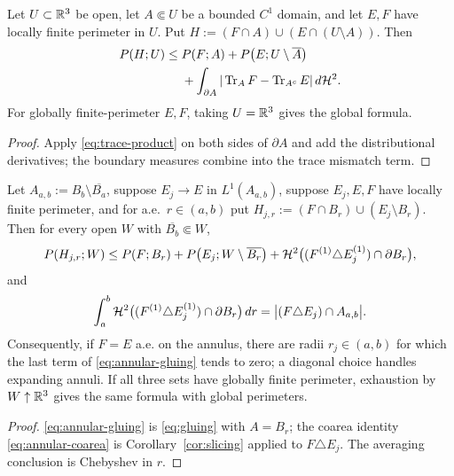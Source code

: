 \begin{proposition}\label{prop:gluing}
Let $U\subset\mathbb R^3$ be open, let $A\Subset U$ be a bounded $C^1$ domain, and
let $E,F$ have locally finite perimeter in $U$.  Put
$H:=(F\cap A)\cup(E\cap(U\setminus A))$.  Then
\begin{equation}\label{eq:gluing}
\begin{aligned}
  P(H;U)
  \le{}&P(F;A)+P\bigl(E;U\setminus\overline A\bigr)\\
  &+\int_{\partial A}|\operatorname{Tr}_AF-\operatorname{Tr}_{A^c}E|\,d\mathcal H^2 .
\end{aligned}
\end{equation}
For globally finite-perimeter $E,F$, taking $U=\mathbb R^3$ gives the global
formula.
\end{proposition}

\begin{proof}
Apply \eqref{eq:trace-product} on both sides of $\partial A$ and add the
distributional derivatives; the boundary measures combine into the trace
mismatch term.
\end{proof}

\begin{proposition}\label{prop:annular-gluing}
Let $A_{a,b}:=B_b\setminus\overline{B_a}$, suppose $E_j\to E$ in
$L^1(A_{a,b})$, suppose $E_j,E,F$ have locally finite perimeter, and for
a.e.\ $r\in(a,b)$ put
$H_{j,r}:=(F\cap B_r)\cup(E_j\setminus B_r)$.  Then
for every open $W$ with $\overline{B_b}\Subset W$,
\begin{equation}\label{eq:annular-gluing}
  P(H_{j,r};W)\le P(F;B_r)
   +P\bigl(E_j;W\setminus\overline{B_r}\bigr)
   +\mathcal H^2\bigl((F^{(1)}\triangle E_j^{(1)})\cap\partial B_r\bigr),
\end{equation}
and
\begin{equation}\label{eq:annular-coarea}
  \int_a^b\mathcal H^2\bigl((F^{(1)}\triangle E_j^{(1)})\cap\partial B_r\bigr)\,dr
  =\bigl|(F\triangle E_j)\cap A_{a,b}\bigr| .
\end{equation}
Consequently, if $F=E$ a.e. on the annulus, there are radii
$r_j\in(a,b)$ for which the last term of
\eqref{eq:annular-gluing} tends to zero; a diagonal choice handles expanding
annuli.  If all three sets have globally finite perimeter, exhaustion by
$W\uparrow\mathbb R^3$ gives the same formula with global perimeters.
\end{proposition}

\begin{proof}
\eqref{eq:annular-gluing} is \eqref{eq:gluing} with $A=B_r$; the coarea
identity \eqref{eq:annular-coarea} is Corollary~\ref{cor:slicing} applied to
$F\triangle E_j$.  The averaging conclusion is Chebyshev in $r$.
\end{proof}

